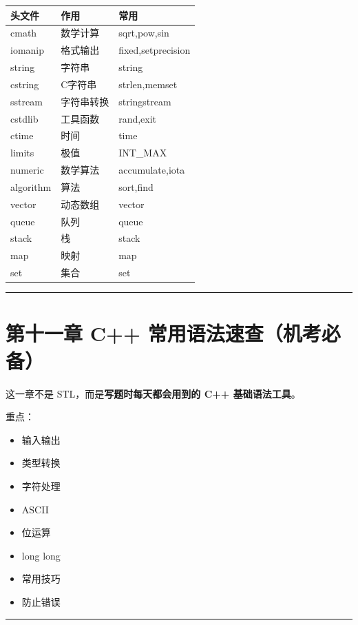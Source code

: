\documentclass[9pt,twocolumn]{extarticle}
\begin{document}
\begin{table}[h]
\centering
\begin{tabular}{|l|l|l|}
\hline
头文件 & 作用 & 常用 \\ \hline
cmath & 数学计算 & sqrt,pow,sin \\ \hline
iomanip & 格式输出 & fixed,setprecision \\ \hline
string & 字符串 & string \\ \hline
cstring & C字符串 & strlen,memset \\ \hline
sstream & 字符串转换 & stringstream \\ \hline
cstdlib & 工具函数 & rand,exit \\ \hline
ctime & 时间 & time \\ \hline
limits & 极值 & INT\_MAX \\ \hline
numeric & 数学算法 & accumulate,iota \\ \hline
algorithm & 算法 & sort,find \\ \hline
vector & 动态数组 & vector \\ \hline
queue & 队列 & queue \\ \hline
stack & 栈 & stack \\ \hline
map & 映射 & map \\ \hline
set & 集合 & set \\ \hline
\end{tabular}
\end{table}

\noindent\rule{\linewidth}{0.4pt}

\section{第十一章 C++ 常用语法速查（机考必备）}

这一章不是 STL，而是\textbf{写题时每天都会用到的 C++ 基础语法工具}。

重点：
\begin{itemize}
    \item 输入输出
    \item 类型转换
    \item 字符处理
    \item ASCII
    \item 位运算
    \item long long
    \item 常用技巧
    \item 防止错误
\end{itemize}

\noindent\rule{\linewidth}{0.4pt}
\end{document}
